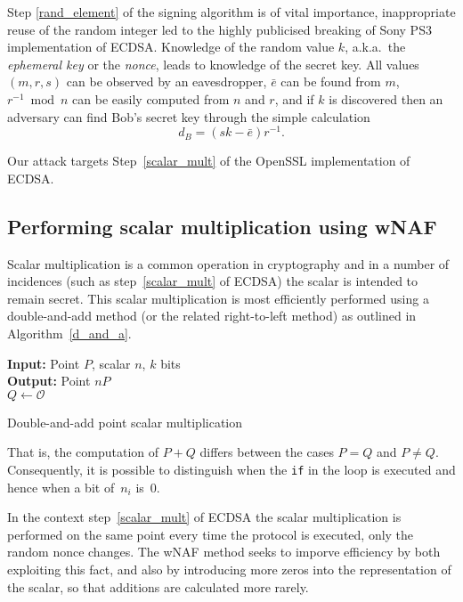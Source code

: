 \documentclass[twocolumn]{article}
\newcommand{\myupcase}[1]{\uppercase{#1}}
\begin{document}
Step \ref{rand_element} of the signing algorithm is of vital importance, inappropriate reuse of the random integer led to the highly publicised breaking of Sony PS3 implementation of \myupcase{ecdsa}. 
Knowledge of the random value $k$, a.k.a.\ the \textit{ephemeral key} or the \textit{nonce}, leads to knowledge of the secret key.
All values $(m,r,s)$ can be observed by an eavesdropper, $\bar{e}$ can be found from $m$, $r^{-1}\bmod n$ can be easily computed from $n$ and $r$, and if $k$ is discovered then an adversary can find Bob's secret key through the simple calculation $$d_B=(sk-\bar{e})r^{-1}.$$

Our attack targets Step~\ref{scalar_mult} of the OpenSSL implementation of \myupcase{ecdsa}.

\subsection{Performing scalar multiplication using wNAF}\label{sub:wnaf}
Scalar multiplication is a common operation in cryptography and in a number of incidences (such as step~\ref{scalar_mult} of \myupcase{ecdsa}) the scalar is intended to remain secret. This scalar multiplication is most efficiently performed using a double-and-add method (or the related right-to-left method) as outlined in Algorithm~\ref{d_and_a}.\\

\begin{algorithm}[htb]\label{d_and_a}
\SetAlgoLined
{\bf Input:} Point $P$, scalar $n$, $k$ bits\\
{\bf Output:} Point $nP$\\
$Q\gets \mathcal{O}$\\
 \caption{Double-and-add point scalar multiplication}
\end{algorithm}\vspace{-0.5cm}


That is, the computation of $P+Q$ differs between the cases $P=Q$ and $P\neq Q.$ Consequently, it is possible to distinguish when the \texttt{if} in the  loop is executed and hence when a bit of~$n_i$ is~0.

In the context step~\ref{scalar_mult} of \myupcase{ecdsa} the scalar multiplication is performed on the same point every time the protocol is executed, only the random nonce changes. The wNAF method seeks to imporve efficiency by both exploiting this fact, and also by introducing more zeros into the representation of the scalar, so that additions are calculated more rarely. 
\end{document}
